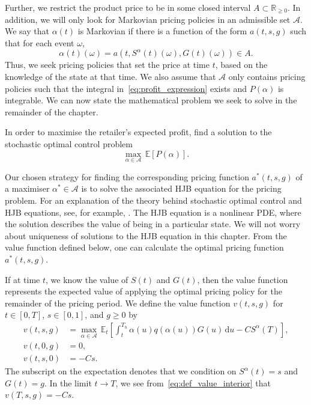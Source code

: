\documentclass[main.tex]{subfiles}
\begin{document}
Further, we restrict the product price to be in some closed  interval
$A\subset\mathbb{R}_{\geq 0}$.
In addition, we will only look for Markovian pricing policies in an
admissible set $\mathcal{A}$. We say that $\alpha(t)$ is Markovian if
there is a function of the form $a(t,s,g)$ such that for each event $\omega$,
\begin{equation}
  \alpha(t)(\omega) = a(t,S^\alpha(t)(\omega), G(t)(\omega)) \in A.
\end{equation}
Thus, we seek pricing policies that set the price at time $t$, based
on the knowledge of the state at that time. We also assume that
$\mathcal{A}$ only contains pricing policies such that the integral
in~\eqref{eq:profit_expression} exists and
$P(\alpha)$ is integrable. We can now state the mathematical problem we
seek to solve in the remainder of the chapter.
\begin{mydef}
  In order to maximise the retailer's expected profit, find a solution to
  the stochastic optimal control problem
  \begin{equation}\label{eq:pricing_problem}
    \max_{\alpha\in \mathcal{A}}\,\mathbb{E}[P(\alpha)].
  \end{equation}
\end{mydef}
Our chosen strategy for finding the corresponding pricing function $a^*(t,s,g)$
of a maximiser $\alpha^*\in\mathcal{A}$ is to solve the associated HJB
equation for the pricing problem.
For an explanation of the theory behind stochastic optimal control and
HJB equations, see, for example, \citet{pham2009continuous}.
The HJB equation is a nonlinear PDE, where the solution describes the
value of being in a particular state. We will not worry about
uniqueness of solutions to the HJB equation in this chapter. From the
value function defined below, one can
calculate the optimal pricing function $a^*(t,s,g)$.

If at time $t$, we know the value of $S(t)$ and $G(t)$, then the value
function represents the expected value of applying the optimal pricing
policy for the remainder of the pricing period.
We define the value function $v(t,s,g)$ for $t\in[0,T]$, $s\in[0,1]$, and $g\geq 0$ by
\begin{align}
  v(t,s,g) &=
             \max_{\alpha \in \mathcal{A}}\,
             \mathbb{E}_{t}\left[
             \int_t^{T_h}\alpha(u)q(\alpha(u))G(u)\,\mathrm{d}u-CS^\alpha(T)
             \right],\label{eq:def_value_interior}\\
  v(t,0,g)&= 0,\\
  v(t,s,0)&=-Cs.
\end{align}
The subscript on the expectation denotes that we condition on
$S^\alpha(t)=s$ and $G(t)=g$.
In the limit $t\to T$, we see from~\eqref{eq:def_value_interior} that
$v(T,s,g)=-Cs$.
\end{document}
